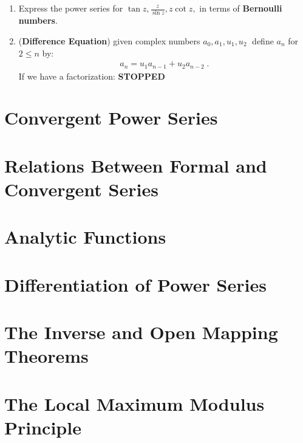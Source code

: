 \begin{enumerate}
  \item Express the power series for $\tan z , \frac{z}{\sin z}, z \cot z ,$ in terms of \textbf{Bernoulli numbers}.
  \item (\textbf{Difference Equation}) given complex numbers $a_0, a_1, u_1, u_2 \;$ define $a_n$ for $2 \leq n$ by:
  \begin{align*}
    a_n = u_1 a_{n - 1} +u_2 a_{n - 2} \;.
  \end{align*}
  If we have a factorization: \textbf{STOPPED}
\end{enumerate}
\section{Convergent Power Series}
\section{Relations Between Formal and Convergent Series}
\section{Analytic Functions}
\section{Differentiation of Power Series}
\section{The Inverse and Open Mapping Theorems}
\section{The Local Maximum Modulus Principle}